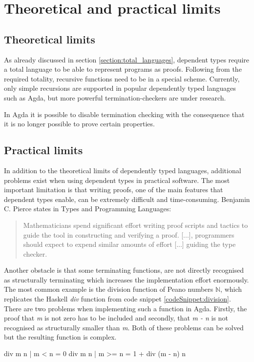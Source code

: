\section{Theoretical and practical limits}\label{section:limits}
\subsection{Theoretical limits}
As already discussed in section \ref{section:total_languages}, dependent types require a total language to be able to represent programs as proofs.
Following from the required totality, recursive functions need to be in a special scheme.
Currently, only simple recursions are supported in popular dependently typed languages such as Agda, but more powerful termination-checkers are under research.

In Agda it is possible to disable termination checking with the consequence that it is no longer possible to prove certain properties.
\subsection{Practical limits}
In addition to the theoretical limits of dependently typed languages, additional problems exist when using dependent types in practical software.
The most important limitation is that writing proofs, one of the main features that dependent types enable, can be extremely difficult and time-consuming.
Benjamin C. Pierce states in Types and Programming Languages\cite{10.5555/509043}:
\begin{quote}
Mathematicians spend significant effort writing proof scripts and tactics to guide the tool in constructing and verifying a proof. [...], programmers should expect to expend similar amounts of effort [...] guiding the type checker. 
\end{quote}

Another obstacle is that some terminating functions, are not directly recognised as structurally terminating which increases the implementation effort enormously.
The most common example is the division function of Peano numbers $\mathbb{N}$, which replicates the Haskell \emph{div} function from code snippet \ref{codeSnippet:division}.
There are two problems when implementing such a function in Agda. Firstly, the proof that \emph{m} is not zero has to be included and secondly, that \emph{m - n} is not recognised as structurally smaller than \emph{m}. Both of these problems can be solved but the resulting function is complex.
\begin{codesnippet}[mathescape=true, caption={Definition of div function in Haskell}, label={codeSnippet:division}]
div m n | m < n = 0
div m n | m >= n = 1 + div (m - n) n
\end{codesnippet}

